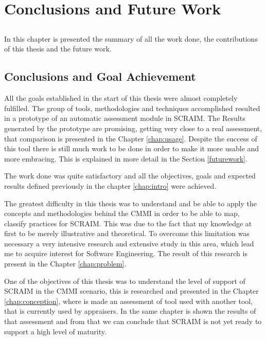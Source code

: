 \chapter{Conclusions and Future Work} \label{chap:conclusion}

\section*{}
In this chapter is presented the summary of all the work done, the contributions of this thesis  and the future work.

\section{Conclusions and Goal Achievement}

All the goals established in the start of this thesis were almost completely fulfilled. The group of tools, methodologies and techniques accomplished resulted in a prototype of an automatic assessment module in SCRAIM. The Results generated by the prototype are promising, getting very close to a real assessment, that comparison is presented in the Chapter \ref{chap:usage}. Despite the success of this tool there is still much work to be done in order to make it more usable and more embracing. This is explained in more detail in the Section \ref{futurework}.

The work done was quite satisfactory and all the objectives, goals and expected results  defined previously in the chapter \ref{chap:intro} were achieved.

The greatest difficulty in this thesis was to understand and be able to apply the concepts and methodologies behind the CMMI in order to be able to map, classify practices for SCRAIM. This was due to the fact that my knowledge at first to be merely illustrative and theoretical. To overcome this limitation was necessary a very intensive research and extensive study in this area, which lead me to acquire interest for Software Engineering. The result of this research is present in the Chapter \ref{chap:problem}.

One of the objectives of this thesis was to understand the level of support of SCRAIM in the CMMI scenario, this is researched and presented in the Chapter \ref{chap:conception}, where is made an assessment of tool used with another tool, that is currently used by appraisers. In the same chapter is shown the results of that assessment and from that we can conclude that SCRAIM is not yet ready to support a high level of maturity.

